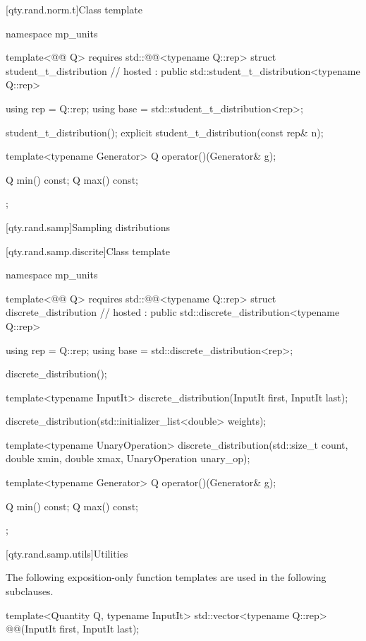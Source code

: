[qty.rand.norm.t]{Class template }

\begin{codeblock}
namespace mp_units {
template<@@ Q>
  requires std::@@<typename Q::rep>
struct student_t_distribution                                                           // hosted
    : public std::student_t_distribution<typename Q::rep> {
  using rep = Q::rep;
  using base = std::student_t_distribution<rep>;

  student_t_distribution();
  explicit student_t_distribution(const rep& n);

  template<typename Generator>
  Q operator()(Generator& g);

  Q min() const;
  Q max() const;
};
}
\end{codeblock}

[qty.rand.samp]{Sampling distributions}

[qty.rand.samp.discrite]{Class template }

\begin{codeblock}
namespace mp_units {
template<@@ Q>
  requires std::@@<typename Q::rep>
struct discrete_distribution                                                            // hosted
    : public std::discrete_distribution<typename Q::rep> {
  using rep = Q::rep;
  using base = std::discrete_distribution<rep>;

  discrete_distribution();

  template<typename InputIt>
  discrete_distribution(InputIt first, InputIt last);

  discrete_distribution(std::initializer_list<double> weights);

  template<typename UnaryOperation>
  discrete_distribution(std::size_t count, double xmin, double xmax, UnaryOperation unary_op);

  template<typename Generator>
  Q operator()(Generator& g);

  Q min() const;
  Q max() const;
};
}
\end{codeblock}

[qty.rand.samp.utils]{Utilities}

\pnum
The following exposition-only function templates are used in the following subclauses.

\begin{itemdecl}
template<Quantity Q, typename InputIt>
std::vector<typename Q::rep> @@(InputIt first, InputIt last);
\end{itemdecl}


